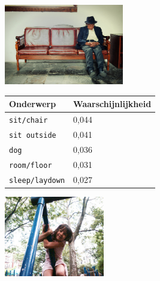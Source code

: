 \begin{figure}
\begin{subfigure}{\textwidth}
    \centering
    \begin{minipage}[t][3.5cm]{.5\linewidth}
    \centering
    \vspace{0pt}
    \includegraphics[height=3.5cm]{Images/LDA/4862204000.jpg}
    \end{minipage}\hfill
    \begin{minipage}[t]{.5\textwidth}
    \centering
    \vspace{0pt}
    \begin{tabular}{ll}
            Onderwerp                           & Waarschijnlijkheid\\
            \hline
            \texttt{sit/chair}             & 0,044 \\
            \texttt{sit outside}                   & 0,041 \\
            \texttt{dog}                 & 0,036 \\
            \texttt{room/floor}           & 0,031 \\
            \texttt{sleep/laydown}        & 0,027\\
            \hline
        \end{tabular}
    \end{minipage}
\end{subfigure}
\vspace*{4mm}
\begin{subfigure}{\textwidth}
    \centering
    \begin{minipage}[t][3.5cm]{.5\linewidth}
    \centering
    \vspace{0pt}
    \includegraphics[height=3.5cm]{Images/LDA/3643021980.jpg}
    \end{minipage}\hfill

\end{subfigure}
\end{figure}
